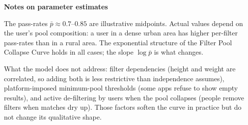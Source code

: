 \documentclass[12pt]{article}
\begin{document}
\noindent\textbf{Notes on parameter estimates}

\medskip
\noindent The pass-rates $\bar{p} \approx 0.7$--$0.85$ are illustrative midpoints. Actual values depend on the user's pool composition: a user in a dense urban area has higher per-filter pass-rates than in a rural area. The exponential structure of the Filter Pool Collapse Curve holds in all cases; the slope $\log \bar{p}$ is what changes.

\medskip
\noindent What the model does not address: filter dependencies (height and weight are correlated, so adding both is less restrictive than independence assumes), platform-imposed minimum-pool thresholds (some apps refuse to show empty results), and active de-filtering by users when the pool collapses (people remove filters when matches dry up). Those factors soften the curve in practice but do not change its qualitative shape.
\end{document}
